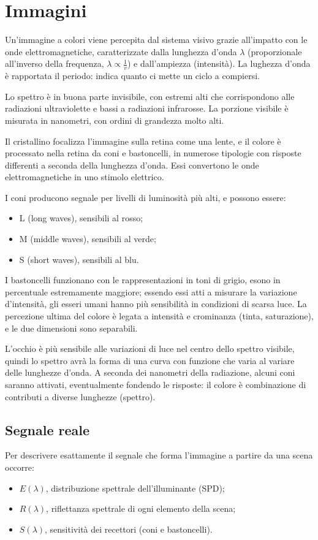 \section{Immagini}
Un'immagine a colori viene percepita dal sistema visivo grazie all'impatto con le onde elettromagnetiche, caratterizzate dalla lunghezza d'onda $\lambda$ (proporzionale all'inverso della frequenza, $\lambda \propto \frac{1}{v}$) e dall'ampiezza (intensità). La lughezza d'onda è rapportata il periodo: indica quanto ci mette un ciclo a compiersi.

Lo spettro è in buona parte invisibile, con estremi alti che corrispondono alle radiazioni ultraviolette e bassi a radiazioni infrarosse. La porzione visibile è misurata in nanometri, con ordini di grandezza molto alti.


Il cristallino focalizza l'immagine sulla retina come una lente, e il colore è processato nella retina da coni e bastoncelli, in numerose tipologie con risposte differenti a seconda della lunghezza d'onda. Essi convertono le onde elettromagnetiche in uno stimolo elettrico.

I coni producono segnale per livelli di luminosità più alti, e possono essere:
\begin{itemize}
	\item L (long waves), sensibili al rosso;
	\item M (middle waves), sensibili al verde;
	\item S (short waves), sensibili al blu.
\end{itemize}

I bastoncelli funzionano con le rappresentazioni in toni di grigio, esono in percentuale estremamente maggiore; essendo essi atti a misurare la variazione d'intensità, gli esseri umani hanno più sensibilità in condizioni di scarsa luce. La percezione ultima del colore è legata a intensità e crominanza (tinta, saturazione), e le due dimensioni sono separabili. 

L'occhio è più sensibile alle variazioni di luce nel centro dello spettro visibile, quindi lo spettro avrà la forma di una curva con funzione che varia al variare delle lunghezze d'onda. A seconda dei nanometri della radiazione, alcuni coni saranno attivati, eventualmente fondendo le risposte: il colore è combinazione di contributi a diverse lunghezze (spettro).


\subsection{Segnale reale}
Per descrivere esattamente il segnale che forma l'immagine a partire da una scena occorre:
\begin{itemize}
	\item $E(\lambda)$, distribuzione spettrale dell'illuminante (SPD);
	\item $R(\lambda)$, riflettanza spettrale di ogni elemento della scena;
	\item $S(\lambda)$, sensitività dei recettori (coni e bastoncelli).
\end{itemize}

